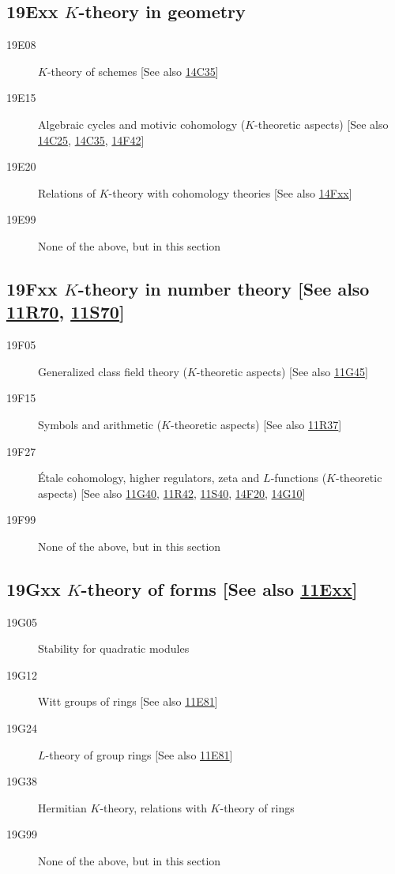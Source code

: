 \subsection*{19Exx  $K$-theory in geometry }\label{19Exx}
\begin{description}  
\item [19E08]\label{19E08} $K$-theory of schemes [See also \hyperref[14C35]{14C35}]
\item [19E15]\label{19E15} Algebraic cycles and motivic cohomology ($K$-theoretic aspects) [See also \hyperref[14C25]{14C25}, \hyperref[14C35]{14C35}, \hyperref[14F42]{14F42}]
\item [19E20]\label{19E20} Relations of $K$-theory with cohomology theories [See also \hyperref[14Fxx]{14Fxx}]
\item [19E99]\label{19E99} None of the above, but in this section
\end{description}
\subsection*{19Fxx  $K$-theory in number theory [See also \hyperref[11R70]{11R70}, \hyperref[11S70]{11S70}] }\label{19Fxx}
\begin{description}  
\item [19F05]\label{19F05} Generalized class field theory ($K$-theoretic aspects) [See also \hyperref[11G45]{11G45}]
\item [19F15]\label{19F15} Symbols and arithmetic ($K$-theoretic aspects) [See also \hyperref[11R37]{11R37}]
\item [19F27]\label{19F27} \'{E}tale cohomology, higher regulators, zeta and $L$-functions ($K$-theoretic aspects) [See also \hyperref[11G40]{11G40}, \hyperref[11R42]{11R42}, \hyperref[11S40]{11S40}, \hyperref[14F20]{14F20}, \hyperref[14G10]{14G10}]
\item [19F99]\label{19F99} None of the above, but in this section
\end{description}
\subsection*{19Gxx  $K$-theory of forms [See also \hyperref[11Exx]{11Exx}] }\label{19Gxx}
\begin{description}  
\item [19G05]\label{19G05} Stability for quadratic modules
\item [19G12]\label{19G12} Witt groups of rings [See also \hyperref[11E81]{11E81}]
\item [19G24]\label{19G24} $L$-theory of group rings [See also \hyperref[11E81]{11E81}]
\item [19G38]\label{19G38} Hermitian $K$-theory, relations with $K$-theory of rings
\item [19G99]\label{19G99} None of the above, but in this section
\end{description}
